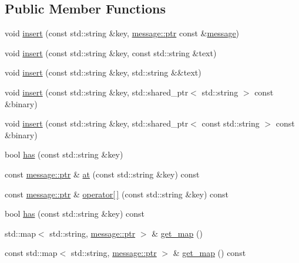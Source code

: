 \subsection*{Public Member Functions}
\begin{DoxyCompactItemize}
\item 
void \hyperlink{classsio_1_1object__message_a1d12ae0a5f6820f54d47e8c84f2f2316}{insert} (const std\+::string \&key, \hyperlink{classsio_1_1message_a6340b6fef57e4516eb17928b1885a615}{message\+::ptr} const \&\hyperlink{classsio_1_1message}{message})
\item 
void \hyperlink{classsio_1_1object__message_a1d00380eb3c8bef206aeeaffc2a9d1e0}{insert} (const std\+::string \&key, const std\+::string \&text)
\item 
void \hyperlink{classsio_1_1object__message_a3932caf1b59398c1a7bf07720614f0b0}{insert} (const std\+::string \&key, std\+::string \&\&text)
\item 
void \hyperlink{classsio_1_1object__message_a8070cf3c80b9f02cb66e0e767666b30f}{insert} (const std\+::string \&key, std\+::shared\+\_\+ptr$<$ std\+::string $>$ const \&binary)
\item 
void \hyperlink{classsio_1_1object__message_aa0c14900ec41c99e1507299a3ee8c7f1}{insert} (const std\+::string \&key, std\+::shared\+\_\+ptr$<$ const std\+::string $>$ const \&binary)
\item 
bool \hyperlink{classsio_1_1object__message_a2afede757162e3c5e70919a47da9d4f0}{has} (const std\+::string \&key)
\item 
const \hyperlink{classsio_1_1message_a6340b6fef57e4516eb17928b1885a615}{message\+::ptr} \& \hyperlink{classsio_1_1object__message_ac2ca0303720d11347e7de69592db9999}{at} (const std\+::string \&key) const
\item 
const \hyperlink{classsio_1_1message_a6340b6fef57e4516eb17928b1885a615}{message\+::ptr} \& \hyperlink{classsio_1_1object__message_a52c7af95802da3f3e3a56a8509e329ee}{operator\mbox{[}$\,$\mbox{]}} (const std\+::string \&key) const
\item 
bool \hyperlink{classsio_1_1object__message_a7b34b62fbd7d8f681509e28b3695d235}{has} (const std\+::string \&key) const
\item 
std\+::map$<$ std\+::string, \hyperlink{classsio_1_1message_a6340b6fef57e4516eb17928b1885a615}{message\+::ptr} $>$ \& \hyperlink{classsio_1_1object__message_ac024fab0eb24248150ab318a4b937b4e}{get\+\_\+map} ()
\item 
const std\+::map$<$ std\+::string, \hyperlink{classsio_1_1message_a6340b6fef57e4516eb17928b1885a615}{message\+::ptr} $>$ \& \hyperlink{classsio_1_1object__message_a35d7f1d654b2a3b753ac01444635203e}{get\+\_\+map} () const
\end{DoxyCompactItemize}
